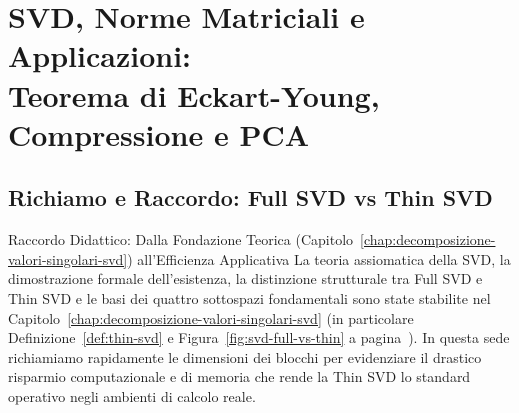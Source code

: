 \chapter[SVD, Norme Matriciali e Applicazioni]{SVD, Norme Matriciali e Applicazioni:\\Teorema di Eckart-Young, Compressione e PCA}
\label{chap:svd-norme-matriciali-applicazioni}

\FloatBarrier
\section{Richiamo e Raccordo: Full SVD vs Thin SVD}
\label{sec:svd-richiamo-full-thin}

\begin{noteblock}{Raccordo Didattico: Dalla Fondazione Teorica (Capitolo~\ref{chap:decomposizione-valori-singolari-svd}) all'Efficienza Applicativa}
La teoria assiomatica della SVD, la dimostrazione formale dell'esistenza, la distinzione strutturale tra Full SVD e Thin SVD e le basi dei quattro sottospazi fondamentali sono state stabilite nel Capitolo~\ref{chap:decomposizione-valori-singolari-svd} (in particolare Definizione~\ref{def:thin-svd} e Figura~\ref{fig:svd-full-vs-thin} a pagina~\pageref{def:thin-svd}).
In questa sede richiamiamo rapidamente le dimensioni dei blocchi per evidenziare il drastico risparmio computazionale e di memoria che rende la Thin SVD lo standard operativo negli ambienti di calcolo reale.
\end{noteblock}

